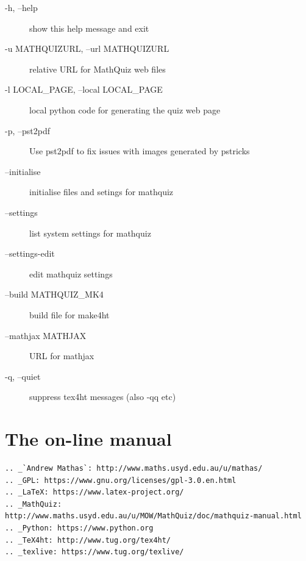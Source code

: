 \documentclass[svgnames]{article}
\begin{document}
    \begin{description}
       \item[ -h, --help]            show this help message and exit
       \item[-u MATHQUIZURL, --url MATHQUIZURL]
                    relative URL for MathQuiz web files
       \item[-l LOCAL\_PAGE, --local LOCAL\_PAGE]
                    local python code for generating the quiz web page
       \item[-p, --pst2pdf]
          Use pst2pdf to fix issues with images generated by pstricks
       \item[--initialise]
          initialise files and setings for mathquiz
          \item[--settings]
          list system settings for mathquiz
          \item[--settings-edit]      edit mathquiz settings
          \item[--build MATHQUIZ\_MK4] build file for make4ht
          \item[--mathjax MATHJAX]    URL for mathjax
          \item[-q, --quiet]          suppress tex4ht messages (also -qq etc)
    \end{description}


  \section{The on-line manual}

    

\begin{verbatim}
.. _`Andrew Mathas`: http://www.maths.usyd.edu.au/u/mathas/
.. _GPL: https://www.gnu.org/licenses/gpl-3.0.en.html
.. _LaTeX: https://www.latex-project.org/
.. _MathQuiz: http://www.maths.usyd.edu.au/u/MOW/MathQuiz/doc/mathquiz-manual.html
.. _Python: https://www.python.org
.. _TeX4ht: http://www.tug.org/tex4ht/
.. _texlive: https://www.tug.org/texlive/
\end{verbatim}
\end{document}
